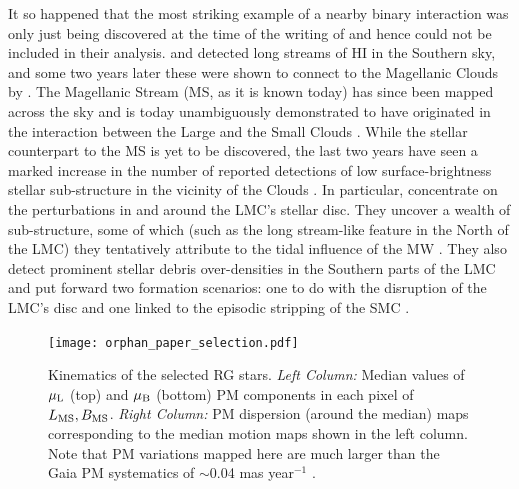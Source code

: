 \documentclass[a4paper,useAMS,usenatbib]{mnras}
\begin{document}
It so happened that the most striking example of a nearby binary
interaction was only just being discovered at the time of the writing
of \citet{Toomre1972} and hence could not be included in their
analysis. \citet{Wannier1972} and \citet{Kuilenburg1972} detected long
streams of HI in the Southern sky, and some two years later these were
shown to connect to the Magellanic Clouds by
\citet{Mathewson1974}. The Magellanic Stream (MS, as it is known
today) has since been mapped across the sky \citep[see
  e.g.][]{Putman2003,Nidever2008,Nidever2010} and is today
unambiguously demonstrated to have originated in the interaction
between the Large and the Small Clouds \citep[LMC and
  SMC,][]{Besla2007, Besla2010, Diaz2011, Diaz2012}. While the stellar
counterpart to the MS is yet to be discovered, the last two years have
seen a marked increase in the number of reported detections of low
surface-brightness stellar sub-structure in the vicinity of the Clouds
\citep[see
  e.g.][]{Mackey2016,Belokurov2016,Belokurov2017,Deason2017,Pieres2017,Mackey2018,Nidever2018}. In
particular, \citet{Mackey2016,Mackey2018} concentrate on the
perturbations in and around the LMC's stellar disc. They uncover a
wealth of sub-structure, some of which (such as the long stream-like
feature in the North of the LMC) they tentatively attribute to the
tidal influence of the MW \citep[][]{Mackey2016}. They also
detect prominent stellar debris over-densities in the Southern parts
of the LMC and put forward two formation scenarios: one to do with the
disruption of the LMC's disc and one linked to the episodic stripping
of the SMC \citep[see also][who argued for the importance of repeated
  interactions with the SMC]{besla_etal_2016}.

%
\begin{figure}
  \centering
  \texttt{[image: orphan\_paper\_selection.pdf]}
  \caption[]{Kinematics of the selected RG stars. {\it Left Column:}
    Median values of $\mu_{\rm L}$ (top) and $\mu_{\rm B}$ (bottom) PM
    components in each pixel of $L_{\rm MS}, B_{\rm MS}$. {\it Right
      Column:} PM dispersion (around the median) maps corresponding to
    the median motion maps shown in the left column. Note that PM
    variations mapped here are much larger than the Gaia PM
    systematics of $\sim$0.04 mas year$^{-1}$ \citep[see][]{Arenou2018}.}
   \label{fig:selection}
\end{figure}
%
\end{document}

